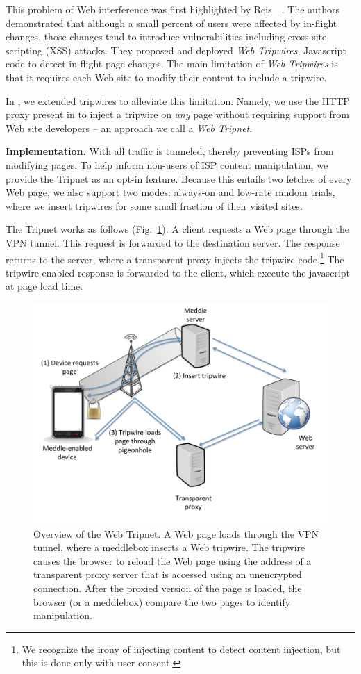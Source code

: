 This problem of Web interference was first highlighted by Reis~\etal~\cite{reis:tripwires}. 
The authors demonstrated that although a small percent of users were affected by in-flight changes, those changes tend to introduce vulnerabilities including cross-site scripting (XSS) attacks. 
They proposed and deployed \emph{Web Tripwires}, Javascript code to detect in-flight page changes. 
The main limitation of \emph{Web Tripwires} is that it requires each Web site to modify their content to include a tripwire.

In \meddle, we extended tripwires to alleviate this limitation. 
Namely, we use the HTTP proxy present in \meddle to inject a tripwire on \emph{any} page 
without requiring support from Web site developers -- an approach we call a \emph{Web Tripnet}.

\noindent\textbf{Implementation.} With \meddle all traffic is tunneled, thereby 
preventing ISPs from modifying pages. To help inform non-users of ISP content 
manipulation, we provide the Tripnet as an opt-in feature. Because this entails 
two fetches of every Web page, we also support two modes: always-on and low-rate random trials, where we 
insert tripwires for some small fraction of their visited sites.

The Tripnet works as follows (Fig.~\ref{fig:tripnet}). A client requests a Web page through the \meddle VPN 
tunnel. This request is forwarded to the destination server. The response returns to 
the \meddle server, where a transparent proxy injects the tripwire code.\footnote{We 
recognize the irony of injecting content to detect content injection, but this is done only with user consent.}
The tripwire-enabled response is forwarded to the client, which execute the javascript at page load time.


\begin{figure}
\centering
\includegraphics[width=0.9\linewidth]{figures/tripnet.pdf}
\caption{Overview of the Web Tripnet. A Web page loads 
through the VPN tunnel, where a meddlebox inserts a Web tripwire. The
tripwire causes the browser to reload the Web page using the address of a
transparent proxy server that is accessed using an unencrypted connection.
After the proxied version of the page is loaded, the browser (or a meddlebox)
compare the two pages to identify manipulation. }
\label{fig:tripnet}
\vspace{\postfigspace}
\end{figure}

